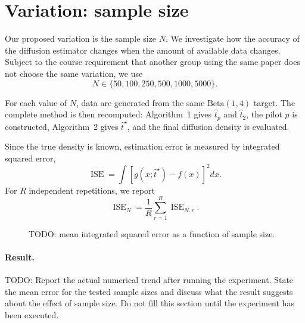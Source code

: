 \documentclass{article}
\begin{document}

\section{Variation: sample size}

Our proposed variation is the sample size $N$. We investigate how the
accuracy of the diffusion estimator changes when the amount of
available data changes. Subject to the course requirement that another
group using the same paper does not choose the same variation, we use
\[
N\in\{50,100,250,500,1000,5000\}.
\]

For each value of $N$, data are generated from the same
$\mathrm{Beta}(1,4)$ target. The complete method is then recomputed:
Algorithm~1 gives $\widehat t_p$ and $\widehat t_2$, the pilot $p$ is
constructed, Algorithm~2 gives $\widehat t^\star$, and the final
diffusion density is evaluated.

Since the true density is known, estimation error is measured by
integrated squared error,
\[
\operatorname{ISE}
=
\int
\left[
g(x;\widehat t^\star)-f(x)
\right]^2dx.
\]
For $R$ independent repetitions, we report
\[
\overline{\operatorname{ISE}}_N
=
\frac{1}{R}
\sum_{r=1}^{R}
\operatorname{ISE}_{N,r}.
\]

%

\begin{figure}[t]
  \centering
  \caption{
    TODO: mean integrated squared error as a function of sample size.
  }
  \label{fig:variation}
\end{figure}

\paragraph{Result.}
TODO: Report the actual numerical trend after running the experiment.
State the mean error for the tested sample sizes and discuss what the
result suggests about the effect of sample size. Do not fill this section
until the experiment has been executed.
\end{document}
